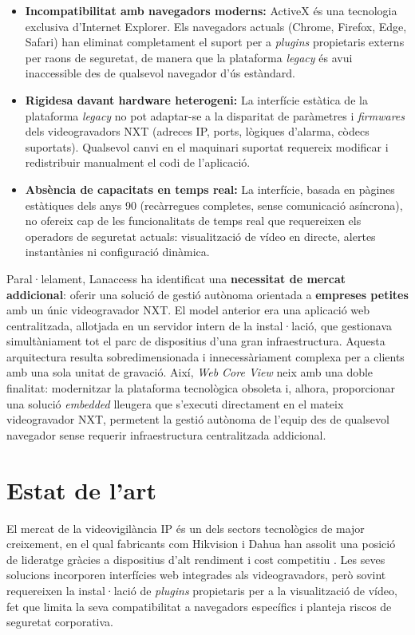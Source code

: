 \begin{itemize}
  \item \textbf{Incompatibilitat amb navegadors moderns:} ActiveX és una tecnologia exclusiva d'Internet Explorer. Els navegadors actuals (Chrome, Firefox, Edge, Safari) han eliminat completament el suport per a \textit{plugins} propietaris externs per raons de seguretat, de manera que la plataforma \textit{legacy} és avui inaccessible des de qualsevol navegador d'ús estàndard.
  \item \textbf{Rigidesa davant hardware heterogeni:} La interfície estàtica de la plataforma \textit{legacy} no pot adaptar-se a la disparitat de paràmetres i \textit{firmwares} dels videogravadors NXT (adreces IP, ports, lògiques d'alarma, còdecs suportats). Qualsevol canvi en el maquinari suportat requereix modificar i redistribuir manualment el codi de l'aplicació.
  \item \textbf{Absència de capacitats en temps real:} La interfície, basada en pàgines estàtiques dels anys 90 (recàrregues completes, sense comunicació asíncrona), no ofereix cap de les funcionalitats de temps real que requereixen els operadors de seguretat actuals: visualització de vídeo en directe, alertes instantànies ni configuració dinàmica.
\end{itemize}

Paral·lelament, Lanaccess ha identificat una \textbf{necessitat de mercat addicional}: oferir una solució de gestió autònoma orientada a \textbf{empreses petites} amb un únic videogravador NXT. El model anterior era una aplicació web centralitzada, allotjada en un servidor intern de la instal·lació, que gestionava simultàniament tot el parc de dispositius d'una gran infraestructura. Aquesta arquitectura resulta sobredimensionada i innecessàriament complexa per a clients amb una sola unitat de gravació. Així, \textit{Web Core View} neix amb una doble finalitat: modernitzar la plataforma tecnològica obsoleta i, alhora, proporcionar una solució \textit{embedded} lleugera que s'executi directament en el mateix videogravador NXT, permetent la gestió autònoma de l'equip des de qualsevol navegador sense requerir infraestructura centralitzada addicional.

\section{Estat de l'art}
El mercat de la videovigilància IP és un dels sectors tecnològics de major creixement, en el qual fabricants com Hikvision i Dahua han assolit una posició de lideratge gràcies a dispositius d'alt rendiment i cost competitiu \cite{ihs_video_surveillance}. Les seves solucions incorporen interfícies web integrades als videogravadors, però sovint requereixen la instal·lació de \textit{plugins} propietaris per a la visualització de vídeo, fet que limita la seva compatibilitat a navegadors específics i planteja riscos de seguretat corporativa.

